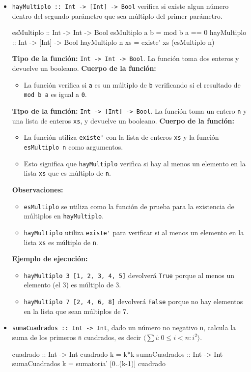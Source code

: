 \documentclass{article}
\begin{document}
\begin{itemize}
    \item 
\verb|hayMultiplo :: Int -> [Int] -> Bool| verifica si existe algun número dentro del segundo parámetro que sea múltiplo del primer parámetro.
\begin{haskell}
esMultiplo :: Int -> Int -> Bool
esMultiplo a b = mod b a == 0
hayMultiplo :: Int -> [Int] -> Bool
hayMultiplo n xs = existe' xs (esMultiplo n)
\end{haskell}
\textbf{Tipo de la función:} \verb|Int -> Int -> Bool|. La función toma dos enteros y devuelve un booleano.
\textbf{Cuerpo de la función:}
\begin{itemize}
\item La función verifica si \verb|a| es un múltiplo de \verb|b| verificando si el resultado de \verb|mod b a| es igual a \verb|0|.
\end{itemize}
\textbf{Tipo de la función:} \verb|Int -> [Int] -> Bool|. La función toma un entero \verb|n| y una lista de enteros \verb|xs|, y devuelve un booleano.
\textbf{Cuerpo de la función:}
\begin{itemize}
\item La función utiliza \verb|existe'| con la lista de enteros \verb|xs| y la función \verb|esMultiplo n| como argumentos.
\item Esto significa que \verb|hayMultiplo| verifica si hay al menos un elemento en la lista \verb|xs| que es múltiplo de \verb|n|.
\end{itemize}
\textbf{Observaciones:}
\begin{itemize}
\item \verb|esMultiplo| se utiliza como la función de prueba para la existencia de múltiplos en \verb|hayMultiplo|.
\item \verb|hayMultiplo| utiliza \verb|existe'| para verificar si al menos un elemento en la lista \verb|xs| es múltiplo de \verb|n|.
\end{itemize}
\textbf{Ejemplo de ejecución:}
\begin{itemize}
\item \verb|hayMultiplo 3 [1, 2, 3, 4, 5]| devolverá \verb|True| porque al menos un elemento (el 3) es múltiplo de 3.
\item \verb|hayMultiplo 7 [2, 4, 6, 8]| devolverá \verb|False| porque no hay elementos en la lista que sean múltiplos de 7.
\end{itemize}

    \item 
\verb|sumaCuadrados :: Int -> Int|, dado un número no negativo \verb|n|, calcula la suma de los primeros \verb|n| cuadrados, es decir $\langle \sum i : 0 \leq i < n : i^2 \rangle$.
\begin{haskell}
cuadrado :: Int -> Int
cuadrado k = k*k
sumaCuadrados :: Int -> Int
sumaCuadrados k = sumatoria' [0..(k-1)] cuadrado 
\end{haskell}

\end{itemize}
\end{document}
